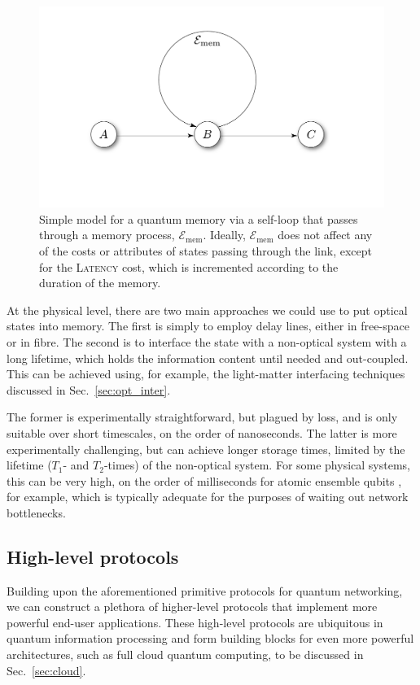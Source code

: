 \documentclass[aps,rmp,twocolumn,amsmath,amssymb,nofootinbib,superscriptaddress,longbibliography,floatfix,table-of-contents,eqsecnum]{revtex4-1}
\begin{document}
\begin{figure}[!htb]
\includegraphics[width=0.7\columnwidth]{memory}
\caption{Simple model for a quantum memory via a self-loop that passes through a memory process, $\mathcal{E}_\text{mem}$. Ideally, $\mathcal{E}_\text{mem}$ does not affect any of the costs or attributes of states passing through the link, except for the \textsc{Latency} cost, which is incremented according to the duration of the memory.} \label{fig:memory}
\end{figure}

At the physical level, there are two main approaches we could use to put optical states into memory. The first is simply to employ delay lines, either in free-space or in fibre. The second is to interface the state with a non-optical system with a long lifetime, which holds the information content until needed and out-coupled. This can be achieved using, for example, the light-matter interfacing techniques discussed in Sec.~\ref{sec:opt_inter}.

The former is experimentally straightforward, but plagued by loss, and is only suitable over short timescales, on the order of nanoseconds. The latter is more experimentally challenging, but can achieve longer storage times, limited by the lifetime ($T_1$- and $T_2$-times) of the non-optical system. For some physical systems, this can be very high, on the order of milliseconds for atomic ensemble qubits \cite{bib:Duan01, bib:Duan02, bib:LauratKimble07}, for example, which is typically adequate for the purposes of waiting out network bottlenecks.

%
%

\subsection{High-level protocols} 

Building upon the aforementioned primitive protocols for quantum networking, we can construct a plethora of higher-level protocols that implement more powerful end-user applications. These high-level protocols are ubiquitous in quantum information processing and form building blocks for even more powerful architectures, such as full cloud quantum computing, to be discussed in Sec.~\ref{sec:cloud}.
\end{document}
